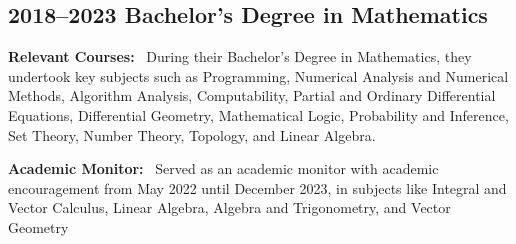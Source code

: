 \subsection{2018--2023 \hfill Bachelor's Degree in Mathematics}

\vspace{5pt}

\textbf{Relevant Courses:} \
During their Bachelor's Degree in Mathematics, they undertook key subjects such as Programming, Numerical Analysis and Numerical Methods, Algorithm Analysis, Computability, Partial and Ordinary Differential Equations, Differential Geometry, Mathematical Logic, Probability and Inference, Set Theory, Number Theory, Topology, and Linear Algebra.

\vspace{5pt}

\textbf{Academic Monitor:} \
Served as an academic monitor with academic encouragement from May 2022 until December 2023, in subjects like Integral and Vector Calculus, Linear Algebra, Algebra and Trigonometry, and Vector Geometry
